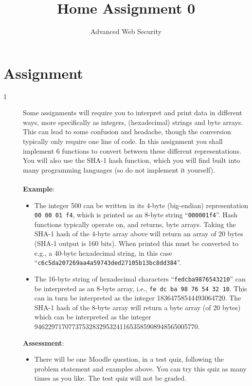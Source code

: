 \documentclass{article}
\begin{document}
\title{Home Assignment 0}
\author{Advanced Web Security}
\date{\the\year}

\maketitle

\section*{Assignment}

\begin{description}
	\item[1~~~]{Some assignments will require you to interpret and print data in different ways, more specifically as integers, 
		(hexadecimal) strings and byte arrays. This can lead to some confusion and headache, though the conversion typically only require one line of code. 
		In this assignment you shall implement 6 functions to convert between these different representations. 
		You will also use the SHA-1 hash function, which you will find built into many programming languages (so do not implement it yourself).\\\\
    \textbf{Example}:
    
	\begin{itemize}
		\item The integer 500 can be written in its 4-byte (big-endian) representation \texttt{00 00 01 f4}, 
			which is printed as an 8-byte string ``\texttt{000001f4}''. Hash functions typically operate on, and returns, byte arrays. 
			Taking the SHA-1 hash of the 4-byte array above will return an array of 20 bytes (SHA-1 output is 160 bits). 
			When printed this must be converted to e.g., a 40-byte hexadecimal string, in this case ``\texttt{c6c5da207269aa4a59743ded27105b13bc8dd384}''.

		\item The 16-byte string of hexadecimal characters ``\texttt{fedcba9876543210}'' can be interpreted as an 8-byte array, 
			i.e., \texttt{fe dc ba 98 76 54 32 10}. This can in turn be interpreted as the integer 18364758544493064720. 
			The SHA-1 hash of the 8-byte array will return a byte array (of 20 bytes) which can be interpreted as the integer 946229717077375328329532411653585908948565005770.
    \end{itemize}
	
	\textbf{Assessment}:
	\begin{itemize}
		\item There will be one Moodle question, in a test quiz, following the problem statement and examples above. You can try this quiz as many times as you like. The test quiz will not be graded.
	\end{itemize}
	}
\end{description}
\end{document}
